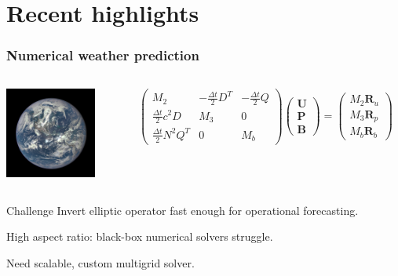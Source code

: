 \documentclass[presentation]{beamer}
\renewcommand{\vec}[1]{\ensuremath{\boldsymbol{#1}}}
\begin{document}
\section{Recent highlights}
\begin{frame}
  \frametitle{Numerical weather prediction}
  \begin{columns}
    \begin{column}{3cm}
      \includegraphics[width=3cm]{earth}
    \end{column}
    \begin{column}{6cm}
      {\footnotesize \begin{equation*}
          \begin{pmatrix}
            M_2 & -\frac{\Delta t}{2}D^T &
            -\frac{\Delta t}{2}Q\\[1ex]
            \frac{\Delta t}{2}c^2D & M_3 & 0\\[1ex]
            \frac{\Delta t}{2}N^2Q^T & 0 & M_b
          \end{pmatrix}
          \begin{pmatrix}
            \vec{U}\\[1ex]\vec{P}\\[1ex]\vec{B}
          \end{pmatrix}
          =
          \begin{pmatrix}
            M_2\vec{R}_u\\[1ex]
            M_3\vec{R}_p\\[1ex]
            M_b\vec{R}_b
          \end{pmatrix}
        \end{equation*}}
    \end{column}
  \end{columns}
  \begin{block}{Challenge}
    Invert elliptic operator fast enough for operational forecasting.

    High aspect ratio: black-box numerical solvers struggle.

    Need scalable, custom multigrid solver.
  \end{block}
\end{frame}
\end{document}
